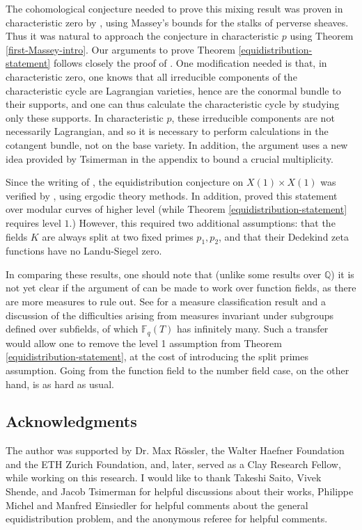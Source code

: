 The cohomological conjecture \citep[Conjecture 1.4]{TS} needed to prove this mixing result was proven in characteristic zero by \citet[Theorem 1.5]{TS}, using Massey's bounds for the stalks of perverse sheaves. Thus it was natural to approach the conjecture in characteristic $p$ using Theorem \ref{first-Massey-intro}. Our arguments to prove Theorem \ref{equidistribution-statement} follows closely the proof of \citep[Theorem 1.5]{TS}. One modification needed is that, in characteristic zero, one knows that all irreducible components of the characteristic cycle are Lagrangian varieties, hence are the conormal bundle to their supports, and one can thus calculate the characteristic cycle by studying only these supports. In characteristic $p$, these irreducible components are not necessarily Lagrangian, and so it is necessary to perform calculations in the cotangent bundle, not on the base variety. In addition, the argument uses a new idea provided by Tsimerman in the appendix to bound a crucial multiplicity.




Since the writing of \citep{TS}, the equidistribution conjecture on $X(1) \times X(1)$ was verified by \citet[Theorem 1.3]{Khayutin}, using ergodic theory methods. In addition, \citet{Khayutin} proved this statement over modular curves of higher level (while Theorem \ref{equidistribution-statement} requires level $1$.) However, this required two additional assumptions: that the fields $K$ are always split at two fixed primes $p_1, p_2$, and that their Dedekind zeta functions have no Landu-Siegel zero.

In comparing these results, one should note that (unlike some results over $\mathbb Q$) it is not yet clear if the argument of \citet{Khayutin} can be made to work over function fields, as there are more measures to rule out. See \citep*[Theorem 1.2 and \S1.3]{ELM} for a measure classification result and a discussion of the difficulties arising from measures invariant under subgroups defined over subfields, of which $\mathbb F_q(T)$ has infinitely many. Such a transfer would allow one to remove the level 1 assumption from Theorem \ref{equidistribution-statement}, at the cost of introducing the split primes assumption. Going from the function field to the number field case, on the other hand, is as hard as usual.



\subsection{Acknowledgments}

The author was supported by Dr. Max R\"{o}ssler, the Walter Haefner Foundation and the ETH Zurich Foundation, and, later, served as a Clay Research Fellow, while working on this research. I would like to thank Takeshi Saito, Vivek Shende, and Jacob Tsimerman for helpful discussions about their works, Philippe Michel and Manfred Einsiedler for helpful comments about the general equidistribution problem, and the anonymous referee for helpful comments.
